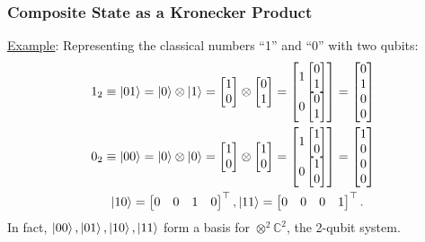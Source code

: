 \documentclass{beamer}
\theoremstyle{definition}
\begin{document}
\begin{frame}
\frametitle{Composite State as a Kronecker Product}
\underline{Example}: Representing the classical numbers ``1'' and ``0'' with two qubits:
\begin{align*}
&1_2 \equiv \left\vert{01}\right\rangle = \left\vert{0}\right\rangle \otimes \left\vert{1}\right\rangle = \begin{bmatrix}
1\\0
\end{bmatrix}\otimes 
\begin{bmatrix}
0\\1
\end{bmatrix}
=
\begin{bmatrix}
1\begin{bmatrix}
0\\1
\end{bmatrix}\\
0\begin{bmatrix}
0\\1
\end{bmatrix}
\end{bmatrix} = \begin{bmatrix}
0\\1\\0\\0
\end{bmatrix}\\
&0_2 \equiv \left\vert{00}\right\rangle = \left\vert{0}\right\rangle \otimes \left\vert{0}\right\rangle = \begin{bmatrix}
1\\0
\end{bmatrix}\otimes 
\begin{bmatrix}
1\\0
\end{bmatrix}
=
\begin{bmatrix}
1\begin{bmatrix}
1\\0
\end{bmatrix}\\
0\begin{bmatrix}
1\\0
\end{bmatrix}
\end{bmatrix} = \begin{bmatrix}
1\\0\\0\\0
\end{bmatrix}\\
&\hspace{0.5cm}\left\vert{10}\right\rangle = \begin{bmatrix}
0&0&1&0
\end{bmatrix}^\top, \left\vert{11}\right\rangle = \begin{bmatrix}
0&0&0&1
\end{bmatrix}^\top.
\end{align*}
In fact, $\left\vert{00}\right\rangle, \left\vert{01}\right\rangle, \left\vert{10}\right\rangle, \left\vert{11}\right\rangle$ form a basis for $\otimes^2\mathbb{C}^{2}$, the 2-qubit system.
\end{frame}
\end{document}
